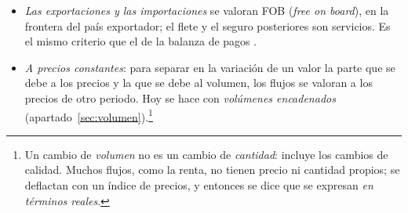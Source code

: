 \documentclass[11pt]{article}
\begin{document}
\begin{itemize}
\begin{equation}\label{eq:valoracion}
\mathrm{PIB}_{\mathrm{pm}}=\sum\mathrm{VAB}_{\mathrm{pb}}+(\text{impuestos}-\text{subvenciones})_{\text{productos}} .
\end{equation}
\item \emph{Las exportaciones y las importaciones} se valoran FOB (\emph{free on board}), en la frontera del país exportador; el flete y el seguro posteriores son servicios. Es el mismo criterio que el de la balanza de pagos .
\item \emph{A precios constantes}: para separar en la variación de un valor la parte que se debe a los precios y la que se debe al volumen, los flujos se valoran a los precios de otro periodo. Hoy se hace con \emph{volúmenes encadenados} (apartado~\ref{sec:volumen}).\footnote{Un cambio de \emph{volumen} no es un cambio de \emph{cantidad}: incluye los cambios de calidad. Muchos flujos, como la renta, no tienen precio ni cantidad propios; se deflactan con un índice de precios, y entonces se dice que se expresan \emph{en términos reales}.}
\end{itemize}

\begin{infografia}[H]
\centering
\caption{De los precios básicos a los precios de adquisición}\label{figu:valoracion}
\end{infografia}
\end{document}
